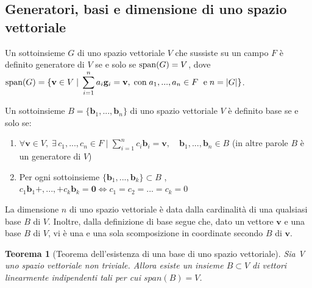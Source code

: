 \documentclass{article}
\newtheorem{theorem}{Teorema}
\begin{document}
\vspace{10pt}
\subsection{Generatori, basi e dimensione di uno spazio vettoriale} \label{subsec:vsgenerators}
    Un sottoinsieme $G$ di uno spazio vettoriale $V$ che sussiste su un campo $F$ è definito generatore di $V$ se e solo se $\textnormal{span}(G) = V$, dove $\textnormal{span}(G) = \{\mathbf{v} \in V \; | \; \displaystyle\sum_{i = 1}^{n} a_i \mathbf{g}_{i} = \mathbf{v}, \; \textnormal{con} \; a_1, ..., a_{n} \in F\ \; \textnormal{e} \; n = |G|\}$.

    \vspace{10pt}
    Un sottoinsieme $B = \{\mathbf{b}_{1},...,\mathbf{b}_{n}\}$ di uno spazio vettoriale $V$ è definito base se e solo se:
    \begin{enumerate}[label=(\arabic*)]
        \item $ \forall \mathbf{v} \in V, \; \exists \, c_1, ..., c_n \in F \; | \; \displaystyle\sum_{i = 1}^{n} c_i \mathbf{b}_{i} = \mathbf{v}, \quad \mathbf{b}_{1}, ..., \mathbf{b}_{n} \in B$ (in altre parole $B$ è un generatore di $V$) 
        \item Per ogni sottoinsieme $\{\mathbf{b}_{1}, ..., \mathbf{b}_{k}\} \subset B$ , $c_1 \mathbf{b}_{1} + , ..., + c_k \mathbf{b}_{k} = \mathbf{0} \iff c_1 = c_2 = ... = c_k = 0 $  
    \end{enumerate}

    \vspace{5pt}
    La dimensione $n$ di uno spazio vettoriale è data dalla cardinalità di una qualsiasi base $B$ di $V$.
    Inoltre, dalla definizione di base segue che, dato un vettore $\mathbf{v}$ e una base $B$ di $V$, vi è una e una sola scomposizione in coordinate secondo $B$ di $\mathbf{v}$.

    \newpage
    \begin{theorem}[Teorema dell'esistenza di una base di uno spazio vettoriale]
        Sia V uno spazio vettoriale non triviale. Allora esiste un insieme $B \subset V$ di vettori linearmente indipendenti tali per cui $span(B) = V$.
    \end{theorem}
\end{document}
